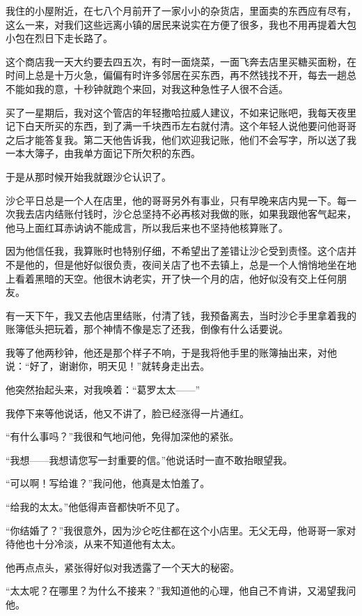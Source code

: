 \par 我住的小屋附近，在七八个月前开了一家小小的杂货店，里面卖的东西应有尽有，这么一来，对我们这些远离小镇的居民来说实在方便了很多，我也不用再提着大包小包在烈日下走长路了。
\par 这个商店我一天大约要去四五次，有时一面烧菜，一面飞奔去店里买糖买面粉，在时间上总是十万火急，偏偏有时许多邻居在买东西，再不然钱找不开，每去一趟总不能如我的意，十秒钟就跑个来回，对我这种急性子人很不合适。
\par 买了一星期后，我对这个管店的年轻撒哈拉威人建议，不如来记账吧，我每天夜里记下白天所买的东西，到了满一千块西币左右就付清。这个年轻人说他要问他哥哥之后才能答复我。第二天他告诉我，他们欢迎我记账，他们不会写字，所以送了我一本大簿子，由我单方面记下所欠积的东西。
\par 于是从那时候开始我就跟沙仑认识了。
\par 沙仑平日总是一个人在店里，他的哥哥另外有事业，只有早晚来店内晃一下。每一次我去店内结账付钱时，沙仑总坚持不必再核对我做的账，如果我跟他客气起来，他马上面红耳赤讷讷不能成言，所以我后来也不坚持他核算账了。
\par 因为他信任我，我算账时也特别仔细，不希望出了差错让沙仑受到责怪。这个店并不是他的，但是他好似很负责，夜间关店了也不去镇上，总是一个人悄悄地坐在地上看着黑暗的天空。他很木讷老实，开了快一个月的店，他好似没有交上任何朋友。
\par 有一天下午，我又去他店里结账，付清了钱，我预备离去，当时沙仑手里拿着我的账簿低头把玩着，那个神情不像是忘了还我，倒像有什么话要说。
\par 我等了他两秒钟，他还是那个样子不响，于是我将他手里的账簿抽出来，对他说：“好了，谢谢你，明天见！”就转身走出去。
\par 他突然抬起头来，对我唤着：“葛罗太太——”
\par 我停下来等他说话，他又不讲了，脸已经涨得一片通红。
\par “有什么事吗？”我很和气地问他，免得加深他的紧张。
\par “我想——我想请您写一封重要的信。”他说话时一直不敢抬眼望我。
\par “可以啊！写给谁？”我问他，他真是太怕羞了。
\par “给我的太太。”他低得声音都快听不见了。
\par “你结婚了？”我很意外，因为沙仑吃住都在这个小店里。无父无母，他哥哥一家对待他也十分冷淡，从来不知道他有太太。
\par 他再点点头，紧张得好似对我透露了一个天大的秘密。
\par “太太呢？在哪里？为什么不接来？”我知道他的心理，他自己不肯讲，又渴望我问他。
